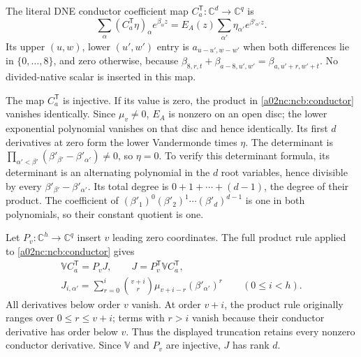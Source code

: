 The literal DNE conductor coefficient map
$C_a^{\mathsf T}:\mathbb C^d\to\mathbb C^q$ is
\begin{equation}\tag{NCB3}\label{a02nc:ncb:conductor}
\sum_\alpha(C_a^{\mathsf T}\eta)_\alpha e^{\beta_\alpha z}
=E_A(z)\sum_{\alpha'}\eta_{\alpha'}e^{\beta'_{\alpha'}z}.
\end{equation}
Its upper $(u,w)$, lower $(u',w')$ entry is
$a_{u-u',w-w'}$ when both differences lie in $\{0,\ldots,8\}$, and
zero otherwise, because
$\beta_{8,r,t}+\beta_{a-8,u',w'}=\beta_{a,u'+r,w'+t}$.
No divided-native scalar is inserted in this map.

The map $C_a^{\mathsf T}$ is injective. If its value is zero, the
product in \eqref{a02nc:ncb:conductor} vanishes identically. Since
$\mu_v\ne0$, $E_A$ is nonzero on an open disc; the lower exponential
polynomial vanishes on that disc and hence identically. Its first $d$
derivatives at zero form the lower Vandermonde times $\eta$. The
determinant is
$\prod_{\alpha'<\beta'}(\beta'_{\beta'}-\beta'_{\alpha'})\ne0$,
so $\eta=0$.
To verify this determinant formula, its determinant is an alternating
polynomial in the $d$ root variables, hence divisible by every
$\beta'_{\beta'}-\beta'_{\alpha'}$. Its total degree is
$0+1+\cdots+(d-1)$, the degree of their product. The coefficient of
$(\beta'_1)^0(\beta'_2)^1\cdots(\beta'_d)^{d-1}$ is one in both
polynomials, so their constant quotient is one.

Let $P_v:\mathbb C^h\to\mathbb C^q$ insert $v$ leading zero
coordinates. The full product rule applied to \eqref{a02nc:ncb:conductor}
gives
\begin{equation}\tag{NCB4}\label{a02nc:ncb:moment-conductor}
\begin{gathered}
\mathbb VC_a^{\mathsf T}=P_vJ,\qquad
J=P_v^{\mathsf T}\mathbb VC_a^{\mathsf T},\\
J_{i,\alpha'}=\sum_{r=0}^{i}
\binom{v+i}{r}\mu_{v+i-r}(\beta'_{\alpha'})^r
\qquad(0\leq i<h).
\end{gathered}
\end{equation}
All derivatives below order $v$ vanish. At order $v+i$, the product
rule originally ranges over $0\leq r\leq v+i$; terms with $r>i$
vanish because their conductor derivative has order below $v$.
Thus the displayed truncation retains every nonzero conductor
derivative. Since $\mathbb V$ and $P_v$ are injective, $J$ has rank $d$.

